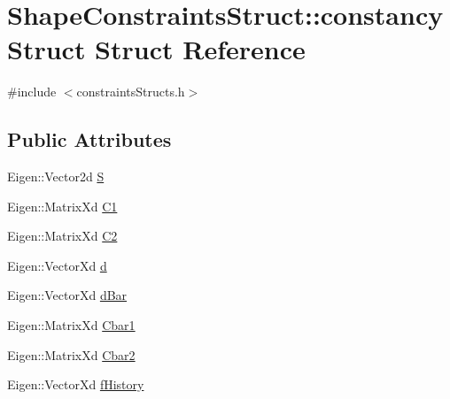 \hypertarget{structShapeConstraintsStruct_1_1constancyStruct}{\section{\-Shape\-Constraints\-Struct\-:\-:constancy\-Struct \-Struct \-Reference}
\label{structShapeConstraintsStruct_1_1constancyStruct}
}


{\ttfamily \#include $<$constraints\-Structs.\-h$>$}

\subsection*{\-Public \-Attributes}
\begin{DoxyCompactItemize}
\item 
\-Eigen\-::\-Vector2d \hyperlink{structShapeConstraintsStruct_1_1constancyStruct_a5101af8a66eb956ac4734155f229f330}{\-S}
\item 
\-Eigen\-::\-Matrix\-Xd \hyperlink{structShapeConstraintsStruct_1_1constancyStruct_a703f12b002822f13a142bf468c193161}{\-C1}
\item 
\-Eigen\-::\-Matrix\-Xd \hyperlink{structShapeConstraintsStruct_1_1constancyStruct_ac2dda40a92114bf4537ed8e837258a61}{\-C2}
\item 
\-Eigen\-::\-Vector\-Xd \hyperlink{structShapeConstraintsStruct_1_1constancyStruct_a361cd12d62134f9ab3597d503bbc34b5}{d}
\item 
\-Eigen\-::\-Vector\-Xd \hyperlink{structShapeConstraintsStruct_1_1constancyStruct_a5f11451bd2f968b7ccc0905229a3f4bf}{d\-Bar}
\item 
\-Eigen\-::\-Matrix\-Xd \hyperlink{structShapeConstraintsStruct_1_1constancyStruct_aac1e5c742a7c5d837e1810722ef88351}{\-Cbar1}
\item 
\-Eigen\-::\-Matrix\-Xd \hyperlink{structShapeConstraintsStruct_1_1constancyStruct_a300bae364575fe901332ccf699e5b5e5}{\-Cbar2}
\item 
\-Eigen\-::\-Vector\-Xd \hyperlink{structShapeConstraintsStruct_1_1constancyStruct_a7dff57685375ede5909c7f732b2bdd8e}{f\-History}
\end{DoxyCompactItemize}


